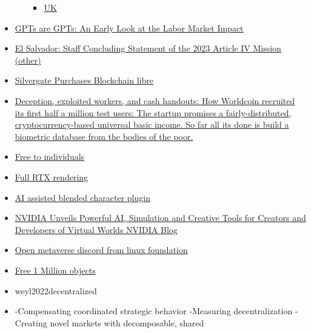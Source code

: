 \begin{itemize}
\begin{itemize}
\begin{itemize}
    \item
      \href{https://www.gov.uk/government/news/uk-sets-out-plans-to-regulate-crypto-and-protect-consumers}{UK}
    \end{itemize}
  \end{itemize}
\item
  \href{https://arxiv.org/abs/2303.10130}{GPTs are GPTs: An Early Look
  at the Labor Market Impact}
\item
  \href{https://www.imf.org/en/News/Articles/2023/02/10/el-salvador-staff-concluding-statement-of-the-2023-article-iv-mission}{El
  Salvador: Staff Concluding Statement of the 2023 Article IV Mission
  (other)}
\item
  \href{https://ir.silvergate.com/news/news-details/2022/Silvergate-Purchases-Blockchain-Payment-Network-Assets-from-Diem/default.aspx}{Silvergate
  Purchases Blockchain libre}
\item
  \href{https://www.technologyreview.com/2022/04/06/1048981/worldcoin-cryptocurrency-biometrics-web3/}{Deception,
  exploited workers, and cash handouts: How Worldcoin recruited its
  first half a million test users: The startup promises a
  fairly-distributed, cryptocurrency-based universal basic income. So
  far all it\textquotesingle s done is build a biometric database from
  the bodies of the poor.}
\item
  \href{https://blogs.nvidia.com/blog/2022/01/04/omniverse-available-free-to-creators/}{Free
  to individuals}
\item
  \href{https://www.youtube.com/watch?v=Jm155QkRjl0\&feature=youtu.be}{Full
  RTX rendering}
\item
  \href{https://blogs.nvidia.com/blog/2023/02/15/blender-alpha-release-omniverse/?ncid=so-link-466434\#cid=ov01_so-link_en-us}{AI
  assisted blended character plugin}
\item
  \href{https://blogs.nvidia.com/blog/2022/08/09/omniverse-siggraph/}{NVIDIA
  Unveils Powerful AI, Simulation and Creative Tools for Creators and
  Developers of Virtual Worlds \textbar{} NVIDIA Blog}
\item
  \href{https://discord.gg/openmetaverse}{Open metaverse discord from
  linux foundation}
\item
  \href{https://huggingface.co/datasets/allenai/objaverse}{Free 1
  Million objects}
\item
  weyl2022decentralized
\item
  -Compensating coordinated strategic behavior -Measuring
  decentralization -Creating novel markets with decomposable, shared

\end{itemize}
